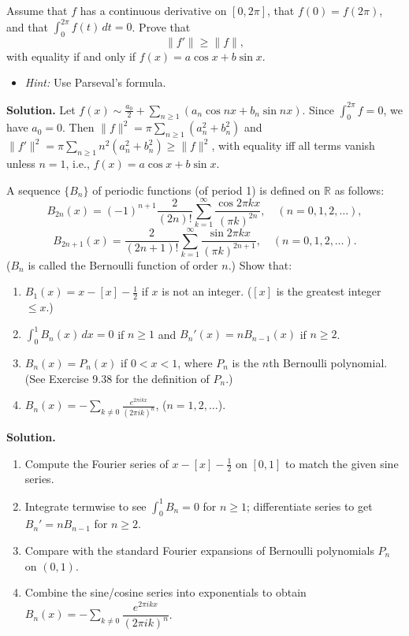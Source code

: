 \begin{problembox}
Assume that $f$ has a continuous derivative on $[0, 2\pi]$, that $f(0) = f(2\pi)$, and that $\int_0^{2\pi} f(t) \, dt = 0$. Prove that
\[
\|f'\| \geq \|f\|,
\]
with equality if and only if $f(x) = a \cos x + b \sin x$.
\begin{itemize}
\item \textit{Hint:} Use Parseval's formula.
\end{itemize}
\end{problembox}

\noindent\textbf{Solution.}
Let $f(x)\sim \tfrac{a_0}{2}+\sum_{n\ge1}(a_n\cos nx+b_n\sin nx)$. Since $\int_0^{2\pi}f=0$, we have $a_0=0$. Then $\|f\|^2=\pi\sum_{n\ge1}(a_n^2+b_n^2)$ and $\|f'\|^2=\pi\sum_{n\ge1} n^2(a_n^2+b_n^2)\ge\|f\|^2$, with equality iff all terms vanish unless $n=1$, i.e., $f(x)=a\cos x+b\sin x$.

\begin{problembox}
A sequence $\{B_n\}$ of periodic functions (of period 1) is defined on $\mathbb{R}$ as follows:
\[
B_{2n}(x) = (-1)^{n+1} \frac{2}{(2n)!} \sum_{k=1}^\infty \frac{\cos 2\pi k x}{(\pi k)^{2n}}, \quad (n = 0, 1, 2, \dots),
\]
\[
B_{2n+1}(x) = \frac{2}{(2n + 1)!} \sum_{k=1}^\infty \frac{\sin 2\pi k x}{(\pi k)^{2n+1}}, \quad (n = 0, 1, 2, \dots).
\]
($B_n$ is called the Bernoulli function of order $n$.) Show that:
\begin{enumerate}[label=(\alph*)]
\item $B_1(x) = x - [x] - \frac{1}{2}$ if $x$ is not an integer. ($[x]$ is the greatest integer $\leq x$.)
\item $\int_0^1 B_n(x) \, dx = 0$ if $n \geq 1$ and $B_n'(x) = n B_{n-1}(x)$ if $n \geq 2$.
\item $B_n(x) = P_n(x)$ if $0 < x < 1$, where $P_n$ is the $n$th Bernoulli polynomial. (See Exercise 9.38 for the definition of $P_n$.)
\item $B_n(x) = -\sum_{k \neq 0} \frac{e^{2\pi i k x}}{(2\pi i k)^n}$, ($n = 1, 2, \dots$).
\end{enumerate}
\end{problembox}

\noindent\textbf{Solution.}
\begin{enumerate}[label=(\alph*)]
\item Compute the Fourier series of $x-[x]-\tfrac12$ on $[0,1]$ to match the given sine series.
\item Integrate termwise to see $\int_0^1 B_n=0$ for $n\ge1$; differentiate series to get $B_n'=nB_{n-1}$ for $n\ge2$.
\item Compare with the standard Fourier expansions of Bernoulli polynomials $P_n$ on $(0,1)$.
\item Combine the sine/cosine series into exponentials to obtain $B_n(x)=-\sum_{k\ne0}\dfrac{e^{2\pi i k x}}{(2\pi i k)^n}$.
\end{enumerate}

